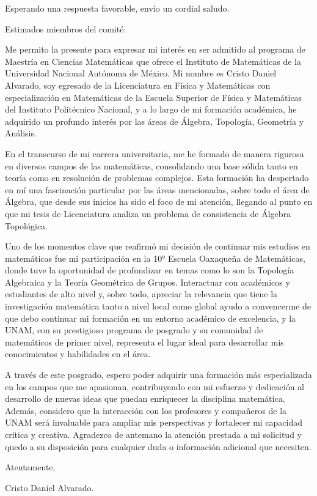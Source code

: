 \documentclass[11pt,a4paper]{moderncv}        %
\begin{document}
\date{10 de febrero de 2025}
\opening{}
\closing{Esperando una respuesta favorable, envío un cordial saludo.}

\makelettertitle

\justifying

Estimados miembros del comité:

Me permito la presente para expresar mi interés en ser admitido al programa de Maestría en Ciencias Matemáticas que ofrece el Instituto de Matemáticas de la Universidad Nacional Autónoma de México. Mi nombre es Cristo Daniel Alvarado, soy egresado de la Licenciatura en Física y Matemáticas con especialización en Matemáticas de la Escuela Superior de Física y Matemáticas del Instituto Politécnico Nacional, y a lo largo de mi formación académica, he adquirido un profundo interés por las áreas de Álgebra, Topología, Geometría y Análisis.

En el transcurso de mi carrera universitaria, me he formado de manera rigurosa en diversos campos de las matemáticas, consolidando una base sólida tanto en teoría como en resolución de problemas complejos. Esta formación ha despertado en mí una fascinación particular por las áreas mencionadas, sobre todo el área de Álgebra, que desde sus inicios ha sido el foco de mi atención, llegando al punto en que mi tesis de Licenciatura analiza un problema de consistencia de Álgebra Topológica.

Uno de los momentos clave que reafirmó mi decisión de continuar mis estudios en matemáticas fue mi participación en la 10° Escuela Oaxaqueña de Matemáticas, donde tuve la oportunidad de profundizar en temas como lo son la Topología Algebraica y la Teoría Geométrica de Grupos. Interactuar con académicos y estudiantes de alto nivel y, sobre todo, apreciar la relevancia que tiene la investigación matemática tanto a nivel local como global ayudo a convencerme de que debo continuar mi formación en un entorno académico de excelencia, y la UNAM, con su prestigioso programa de posgrado y su comunidad de matemáticos de primer nivel, representa el lugar ideal para desarrollar mis conocimientos y habilidades en el área.

A través de este posgrado, espero poder adquirir una formación más especializada en los campos que me apasionan, contribuyendo con mi esfuerzo y dedicación al desarrollo de nuevas ideas que puedan enriquecer la disciplina matemática. Además, considero que la interacción con los profesores y compañeros de la UNAM será invaluable para ampliar mis perspectivas y fortalecer mi capacidad crítica y creativa. Agradezco de antemano la atención prestada a mi solicitud y quedo a su disposición para cualquier duda o información adicional que necesiten.

Atentamente,

Cristo Daniel Alvarado.
\end{document}
